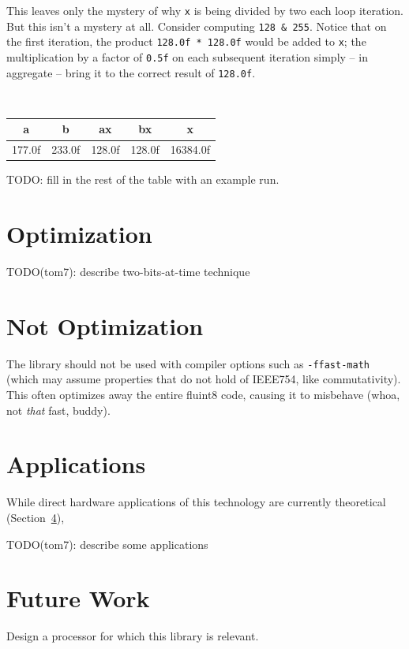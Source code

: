 \documentclass{acmsiggraph}
\theoremstyle{remark}
\theoremstyle{definition}
\begin{document}
This leaves only the mystery of why {\tt x} is being divided by two each loop iteration.
But this isn't a mystery at all.
Consider computing {\tt 128 \& 255}.
Notice that on the first iteration, the product {\tt 128.0f * 128.0f} would be added to {\tt x};
the multiplication by a factor of {\tt 0.5f} on each subsequent iteration simply -- in aggregate -- bring it to the correct result of {\tt 128.0f}.

{ \tt
\begin{tabular}{r|r|r|r|r}
\multicolumn{1}{c|}{a} &
\multicolumn{1}{c|}{b} &
\multicolumn{1}{c|}{ax} &
\multicolumn{1}{c|}{bx} &
\multicolumn{1}{c}{x} \\\hline
177.0f & 233.0f & 128.0f & 128.0f & 16384.0f \\
\end{tabular}
}

TODO: fill in the rest of the table with an example run.

\section{Optimization}

TODO(tom7): describe two-bits-at-time technique

\section{Not Optimization}

The library should not be used with compiler options such as
\verb+-ffast-math+ (which may assume properties that do not hold of
IEEE754, like commutativity). This often optimizes away the entire
fluint8 code, causing it to misbehave (whoa, not {\em that} fast,
buddy).

\section{Applications}

While direct hardware applications of this technology are currently
theoretical (Section~\ref{sec:future}), 

TODO(tom7): describe some applications

\section{Future Work} \label{sec:future}

Design a processor for which this library is relevant.
\end{document}
